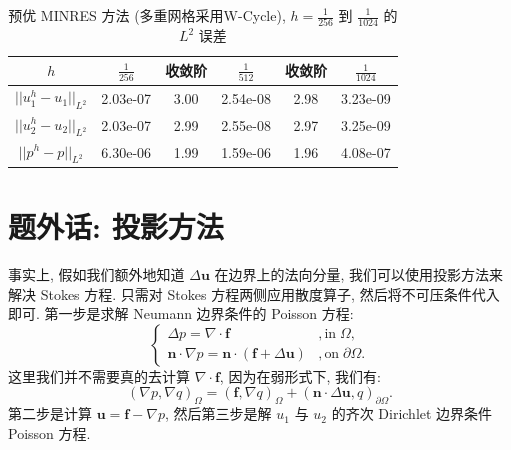 \documentclass[lang=cn,11pt,a4paper]{elegantpaper}
\begin{document}
\vspace{-1em}
\begin{table}[H]
    \centering
    \begin{tabular}{cccccc}
    \hline
         $h$               & $\frac{1}{256}$ & 收敛阶  & $\frac{1}{512}$ & 收敛阶  & $\frac{1}{1024}$ \\ \hline
         $||u_1^h-u_1||_{L^2}$ & 2.03e-07        & 3.00 & 2.54e-08        & 2.98 & 3.23e-09         \\
         $||u_2^h-u_2||_{L^2}$ & 2.03e-07        & 2.99 & 2.55e-08        & 2.97 & 3.25e-09         \\
         $||p^h-p||_{L^2}$     & 6.30e-06        & 1.99 & 1.59e-06        & 1.96 & 4.08e-07         \\ \hline
    \end{tabular}
    \caption{\small 预优 MINRES 方法 (多重网格采用W-Cycle), $h=\frac{1}{256}$ 到 $\frac{1}{1024}$ 的 $L^2$ 误差}
\end{table}

\vspace{-2em}
\section{题外话: 投影方法}
\vspace{-0.5em}

事实上, 假如我们额外地知道 $\Delta \mathbf{u}$ 在边界上的法向分量, 
我们可以使用投影方法来解决 Stokes 方程. 
只需对 Stokes 方程两侧应用散度算子, 然后将不可压条件代入即可. 
第一步是求解 Neumann 边界条件的 Poisson 方程: 
\begin{equation}
    \left\{
        \begin{array}{ll}
            \Delta p = \nabla \cdot \mathbf{f}& ,\text{in}\;\Omega,\\
            \mathbf{n}\cdot\nabla p = \mathbf{n}\cdot(\mathbf{f}+\Delta\mathbf{u}) & ,\text{on}\;\partial \Omega.
        \end{array}
    \right.
\end{equation}
这里我们并不需要真的去计算 $\nabla \cdot \mathbf{f}$, 因为在弱形式下, 我们有: 
\begin{equation}
    (\nabla p,\nabla q)_\Omega=(\mathbf{f},\nabla q)_\Omega+(\mathbf{n}\cdot\Delta\mathbf{u},q)_{\partial \Omega}.
\end{equation}
第二步是计算 $\mathbf{u}=\mathbf{f}-\nabla p$, 
然后第三步是解 $u_1$ 与 $u_2$ 的齐次 Dirichlet 边界条件 Poisson 方程. 
\end{document}
